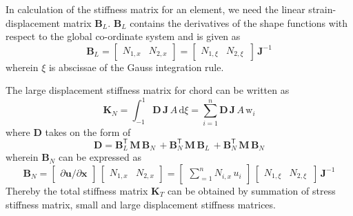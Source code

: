 In calculation of the stiffness matrix for an element, we need the linear strain-displacement matrix $\mathbf{B}_L$. $\mathbf{B}_L$ contains the derivatives of the shape functions with respect to the global co-ordinate system and is given as 
\begin{equation}
\mathbf{B}_L = \begin{bmatrix}
N_{1,x} &   N_{2,x}
\end{bmatrix} = \begin{bmatrix}
N_{1,\xi} &   N_{2,\xi} \, 
\end{bmatrix} \, \mathbf{J}^{-1}
\end{equation}
wherein $\xi$ is abscissae of the Gauss integration rule. 

The large displacement stiffness matrix for chord can be written as
\begin{equation}
\mathbf{K}_{N} = \int_{-1}^{1} \mathbf{D} \, \mathbf{J}  \, A \,  \mathrm{d} \xi 
= \sum_{i=1}^{n} \mathbf{D} \, \mathbf{J} \, A \, \mathrm{w}_i
\end{equation}
where $\mathbf{D}$ takes on the form of
\begin{equation}
\mathbf{D} = \mathbf{B}_L^{\mathsf{T}} \, \mathbf{M} \, \mathbf{B}_N \, + \mathbf{B}_N^{\mathsf{T}} \, \mathbf{M} \, \mathbf{B}_L \, + \mathbf{B}_N^{\mathsf{T}} \, \mathbf{M} \, \mathbf{B}_N 
\end{equation}
wherein $\mathbf{B}_N$ can be expressed as 
\begin{equation}
\mathbf{B}_{N} =  \begin{bmatrix}
\partial \mathbf{u} / \partial \mathbf{x} 
\end{bmatrix} \, \begin{bmatrix}
N_{1,x} &  N_{2,x}
\end{bmatrix} = \begin{bmatrix}
\sum\nolimits_{=1}^n N_{i,x} \, u_i
\end{bmatrix} \, \begin{bmatrix}
N_{1,\xi} &   N_{2,\xi} \, 
\end{bmatrix} \, \mathbf{J}^{-1} 
\end{equation}
Thereby the total stiffness matrix $\mathbf{K}_T$ can be obtained by summation of stress stiffness matrix, small and large displacement stiffness matrices.

